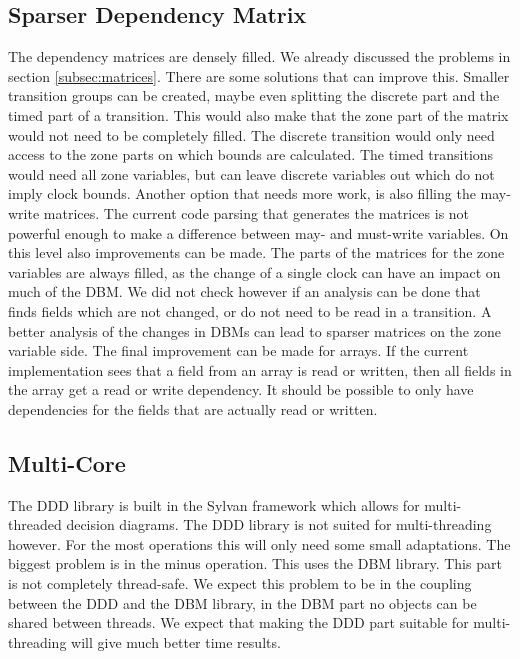 \subsection{Sparser Dependency Matrix}
The dependency matrices are densely filled. We already discussed the problems in section \ref{subsec:matrices}. There are some solutions that can improve this. Smaller transition groups can be created, maybe even splitting the discrete part and the timed part of a transition. This would also make that the zone part of the matrix would not need to be completely filled. The discrete transition would only need access to the zone parts on which bounds are calculated. The timed transitions would need all zone variables, but can leave discrete variables out which do not imply clock bounds. Another option that needs more work, is also filling the may-write matrices. The current code parsing that generates the matrices is not powerful enough to make a difference between may- and must-write variables. On this level also improvements can be made. The parts of the matrices for the zone variables are always filled, as the change of a single clock can have an impact on much of the DBM. We did not check however if an analysis can be done that finds fields which are not changed, or do not need to be read in a transition. A better analysis of the changes in DBMs can lead to sparser matrices on the zone variable side. The final improvement can be made for arrays. If the current implementation sees that a field from an array is read or written, then all fields in the array get a read or write dependency. It should be possible to only have dependencies for the fields that are actually read or written.

\subsection{Multi-Core}
The DDD library is built in the Sylvan framework which allows for multi-threaded decision diagrams. The DDD library is not suited for multi-threading however. For the most operations this will only need some small adaptations. The biggest problem is in the minus operation. This uses the DBM library. This part is not completely thread-safe. We expect this problem to be in the coupling between the DDD and the DBM library, in the DBM part no objects can be shared between threads. We expect that making the DDD part suitable for multi-threading will give much better time results.

